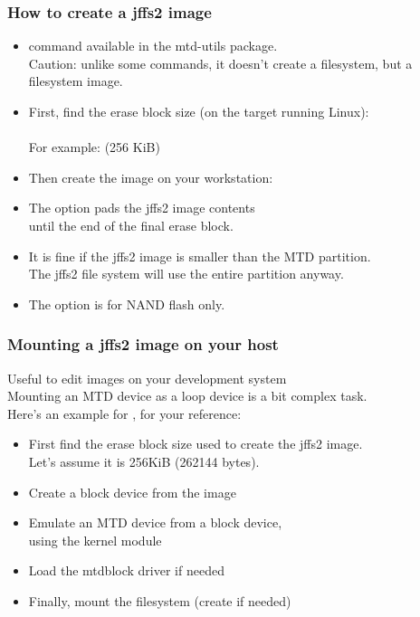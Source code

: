 \begin{frame}
  \frametitle{How to create a jffs2 image}
  \begin{itemize}
  \item {} command available in the mtd-utils package.\\
    Caution: unlike some  commands, it doesn't create a
    filesystem, but a filesystem image.
  \item First, find the erase block size (on the target running Linux):\\
     \\
    For example:  (256 KiB)
  \item Then create the image on your workstation:\\
  \item The  option pads the jffs2 image contents\\
    until the end of the final erase block.
  \item It is fine if the jffs2 image is smaller than the MTD partition.\\
    The jffs2 file system will use the entire partition anyway.
  \item The  option is for NAND flash only.
  \end{itemize}
\end{frame}

\begin{frame}
  \frametitle{Mounting a jffs2 image on your host}
  Useful to edit  images on your development system\\
  Mounting an MTD device as a loop device is a bit complex task.\\
  Here's an example for , for your reference:
  \begin{itemize}
  \item First find the erase block size used to create the jffs2 image.\\
    Let's assume it is 256KiB (262144 bytes).
  \item Create a block device from the image\\
  \item Emulate an MTD device from a block device,\\
    using the  kernel module\\
  \item Load the mtdblock driver if needed\\
  \item Finally, mount the filesystem (create  if needed)\\
  \end{itemize}
\end{frame}

